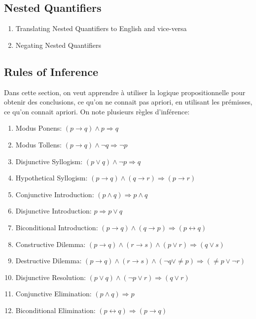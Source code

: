 \documentclass{article}
\begin{document}
\subsection{Nested Quantifiers}

\begin{enumerate}
    \item Translating Nested Quantifiers to English and vice-versa
    \item Negating Nested Quantifiers
\end{enumerate}

\subsection{Rules of Inference}

Dans cette section, on veut apprendre à utiliser la logique propositionnelle
pour obtenir des conclusions, ce qu'on ne connait pas apriori, en
utilisant les prémisses, ce qu'on connait apriori. On note plusieurs
règles d'inférence:

\begin{proposition}
    \begin{enumerate}
	\item Modus Ponens: $ (p \to q) \land p \Longrightarrow q$
	\item Modus Tollens: $ (p \to q) \land \neg q \Longrightarrow
	    \neg p$
	\item Disjunctive Syllogism: $ (p \lor q) \land \neg p
	    \Longrightarrow q$
	\item Hypothetical Syllogism: $ (p \to q) \land (q \to r)
	    \Longrightarrow (p \to r)$
	\item Conjunctive Introduction: $(p \land q) \Longrightarrow
	    p \land q$
	\item Disjunctive Introduction: $ p \Longrightarrow p \lor q$
	\item Biconditional Introduction: $ (p \to q) \land (q \to p)
	    \Longrightarrow (p \leftrightarrow q)$
	\item Constructive Dilemma: $(p \to q) \land (r \to s)
	    \land (p \lor r) \Longrightarrow (q \lor s)$
	\item Destructive Dilemma: $(p \to q) \land (r \to s)
	    \land (\neg q \lor \neq p) \Longrightarrow
	    (\neq p \lor \neg r)$
	\item Disjunctive Resolution: $(p \lor q) \land (\neg p \lor r)
	    \Longrightarrow (q \lor r)$
	\item Conjunctive Elimination: $ (p \land q) \Longrightarrow p$
	\item Biconditional Elimination: $ (p \leftrightarrow q)
	    \Longrightarrow (p \to q)$
    \end{enumerate}
\end{proposition}
\end{document}
